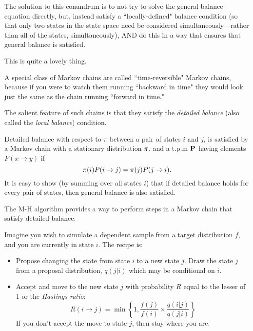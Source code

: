 The solution to this conundrum is to not try to solve the general balance equation directly, but, instead satisfy a ``locally-defined" balance condition (so that only two states in the state space need be considered simultaneously---rather than all of the states, simultaneously), AND do this in a way that ensures that general balance is satisfied.

This is quite a lovely thing.   

A special class of Markov chains are called ``time-reversible" Markov chains, because if you were to watch them running ``backward in time" they would look just the same as the chain running ``forward in time."  

The salient feature of such chains is that they satisfy the {\em detailed balance} (also called the {\em local balance}) condition.

Detailed balance with respect to $\pi$ between a pair of states $i$ and $j$, is satisfied  by a Markov chain with a stationary distribution ${\pi}$, and a t.p.m $\mathbf{P}$ having elements $P(x\rightarrow y)$ if  
\[
	{\pi}(i)P(i\rightarrow j) = {\pi}(j)P(j\rightarrow i).
\]
It is easy to show (by summing over all states $i$) that if detailed balance holds for every pair of states, then general balance is also satisfied.

The M-H algorithm provides a way to perform steps in a Markov chain that satisfy detailed balance. 

Imagine you wish to simulate a dependent sample from a target distribution $f$, and you are currently in state $i$.  The recipe is:
\begin{itemize}
\item Propose changing the state from state $i$ to a new state $j$.  Draw the state $j$ from a proposal distribution, $q(j|i)$ which may be conditional on $i$.
\item Accept and move to the new state $j$ with probability $R$ equal to the lesser of 1 or the {\em Hastings ratio}:
\[
	R(i\rightarrow j) = \min\left\{1,\frac{f(j)}{f(i)}\times\frac{q(i|j)}{q(j|i)}\right\}
\]
If you don't accept the move to state $j$, then stay where you are.
\end{itemize}




\enlargethispage*{1000pt}
\vspace*{-1.5em}


